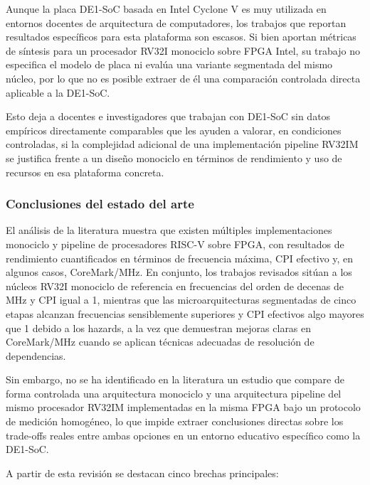 Aunque la placa DE1-SoC basada en Intel Cyclone V es muy utilizada en
entornos docentes de arquitectura de computadores, los trabajos que reportan
resultados específicos para esta plataforma son escasos.\parencite{Wei2024NEORV32}
Si bien \textcite{Goh2024UTHMRISCV} aportan métricas de síntesis para un
procesador RV32I monociclo sobre FPGA Intel, su trabajo no especifica el
modelo de placa ni evalúa una variante segmentada del mismo núcleo, por lo
que no es posible extraer de él una comparación controlada directa aplicable
a la DE1-SoC.

Esto deja a docentes e investigadores que trabajan con DE1-SoC sin datos
empíricos directamente comparables que les ayuden a valorar, en condiciones
controladas, si la complejidad adicional de una implementación pipeline RV32IM
se justifica frente a un diseño monociclo en términos de rendimiento y uso de
recursos en esa plataforma concreta.


\subsubsection{Conclusiones del estado del arte}


El análisis de la literatura muestra que existen múltiples implementaciones
monociclo y pipeline de procesadores RISC-V sobre FPGA, con resultados de
rendimiento cuantificados en términos de frecuencia máxima, CPI efectivo y,
en algunos casos, CoreMark/MHz.\parencite{Goh2024UTHMRISCV,Wei2024NEORV32,Heinz2019Catalog}
En conjunto, los trabajos revisados sitúan a los núcleos RV32I monociclo de
referencia en frecuencias del orden de decenas de MHz y CPI igual a 1, mientras
que las microarquitecturas segmentadas de cinco etapas alcanzan frecuencias
sensiblemente superiores y CPI efectivos algo mayores que 1 debido a los
hazards, a la vez que demuestran mejoras claras en CoreMark/MHz cuando se
aplican técnicas adecuadas de resolución de
dependencias.\parencite{Patterson2017Computer,Heinz2019Catalog}

Sin embargo, no se ha identificado en la literatura un estudio que compare de
forma controlada una arquitectura monociclo y una arquitectura pipeline del
mismo procesador RV32IM implementadas en la misma FPGA bajo un protocolo de
medición homogéneo, lo que impide extraer conclusiones directas sobre los
trade-offs reales entre ambas opciones en un entorno educativo específico como
la DE1-SoC.\parencite{Goh2024UTHMRISCV,Heinz2019Catalog}

    
A partir de esta revisión se destacan cinco brechas principales:

